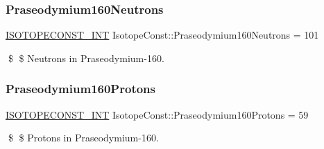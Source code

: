 \subsubsection{\texorpdfstring{Praseodymium160\+Neutrons}{Praseodymium160Neutrons}}
{\footnotesize\ttfamily \mbox{\hyperlink{group___isotope_const-_macros_ga5f18360b3e99483a35c32d789e62621c}{I\+S\+O\+T\+O\+P\+E\+C\+O\+N\+S\+T\+\_\+\+I\+NT}} Isotope\+Const\+::\+Praseodymium160\+Neutrons = 101}

\$ \$ Neutrons in Praseodymium-\/160. \mbox{\label{group___isotope_const-_praseodymium-_pr160_ga66a7df52ee98278f71ef3f9a7291837f}} 
\subsubsection{\texorpdfstring{Praseodymium160\+Protons}{Praseodymium160Protons}}
{\footnotesize\ttfamily \mbox{\hyperlink{group___isotope_const-_macros_ga5f18360b3e99483a35c32d789e62621c}{I\+S\+O\+T\+O\+P\+E\+C\+O\+N\+S\+T\+\_\+\+I\+NT}} Isotope\+Const\+::\+Praseodymium160\+Protons = 59}

\$ \$ Protons in Praseodymium-\/160. 